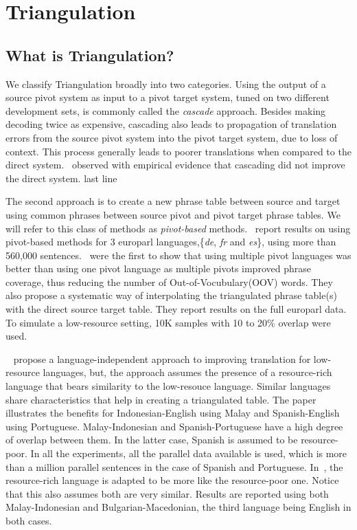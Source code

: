 
%
%

\chapter{Triangulation}
\label{chap:triangulation}

\section{What is Triangulation?}
\label{sec:triangulation}

 We classify Triangulation broadly into two categories. Using the output of a source pivot system as input to a pivot target system, tuned on two different development sets, is commonly called the \emph{cascade} approach. Besides making decoding twice as expensive, cascading also leads to propagation of translation errors from the source pivot system into the pivot target system, due to loss of context. This process generally leads to poorer translations when compared to the direct system.~\cite{Utiyama:07,Gispert:06} observed with empirical evidence that cascading did not improve the direct system. \alert{last line}

 The second approach is to create a new phrase table between source and target using common phrases between source pivot and pivot target phrase tables. We will refer to this class of methods as \emph{pivot-based} methods.~\cite{Utiyama:07}  report results on using pivot-based methods for 3 europarl languages,\{\emph{de}, \emph{fr} and \emph{es}\}, using more than 560,000 sentences.~\cite{Cohn:07} were the first to show that using multiple pivot languages was better than using one pivot language as multiple pivots improved phrase coverage, thus reducing the number of Out-of-Vocubulary(OOV) words. They also propose a systematic way of interpolating the triangulated phrase table(s) with the direct source target table. They report results on the full europarl data. To simulate a low-resource setting, 10K samples with 10 to 20\% overlap were used.


 ~\cite{Nakov:12} propose a language-independent approach to improving translation for low-resource languages, but, the approach assumes the presence of a resource-rich language that bears similarity to the low-resouce language. Similar languages share characteristics that help in creating a triangulated table. The paper illustrates the benefits for Indonesian-English using Malay and Spanish-English using Portuguese. Malay-Indonesian and Spanish-Portuguese have a high degree of overlap between them. In the latter case, Spanish is assumed to be resource-poor. In all the experiments, all the parallel data available is used, which is more than a million parallel sentences in the case of Spanish and Portuguese. In~\cite{Nakovemnlp:12}, the resource-rich language is adapted to be more like the resource-poor one. Notice that this also assumes both are very similar. Results are reported using both Malay-Indonesian and Bulgarian-Macedonian, the third language being English in both cases.

